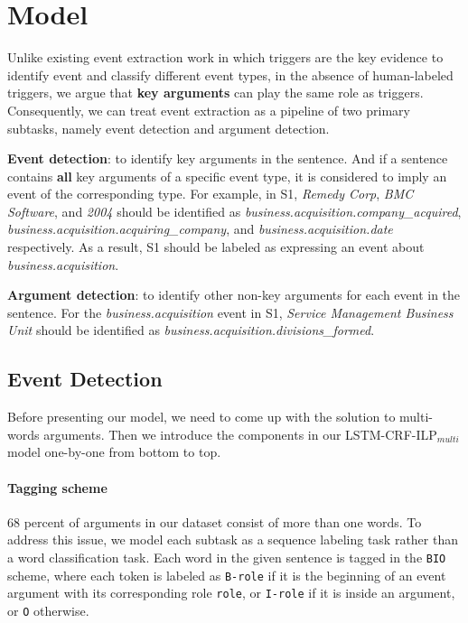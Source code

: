 \section{Model}
Unlike existing event extraction work in which triggers are the key evidence to identify event and classify different event types, in the absence of human-labeled triggers, we argue that \textbf{key arguments} can play the same role as triggers. Consequently, we can treat event extraction as a pipeline of two primary subtasks, namely event detection and argument detection.

\noindent \textbf{Event detection}: to identify key arguments in the sentence. And if a sentence contains \textbf{all} key arguments of a specific event type, it is considered to imply an event of the corresponding type. For example, in S1, \emph{Remedy Corp}, \emph{BMC Software}, and \emph{2004} should be identified as \emph{business.acquisition.company\_acquired}, \emph{business.acquisition.acquiring\_company}, and \emph{business.acquisition.date} respectively. As a result, S1 should be labeled as expressing an event about \emph{business.acquisition}.

\noindent \textbf{Argument detection}: to identify other non-key arguments for each event in the sentence. For the \emph{business.acquisition} event in S1, \emph{Service Management Business Unit} should be identified as \emph{business.acquisition.divisions\_formed}.

\subsection{Event Detection \label{evede}}
Before presenting our model, we need to come up with the solution to multi-words arguments. Then we introduce the components in our LSTM-CRF-ILP$_{multi}$ model one-by-one from bottom to top.

\paragraph{Tagging scheme}
68 percent of arguments in our dataset consist of more than one words. To address this issue, we model each subtask as a sequence labeling task rather than a word classification task. Each word in the given sentence is tagged in the \texttt{BIO} scheme, where each token is labeled as \texttt{B-role} if it is the beginning of an event argument with its corresponding role \texttt{role}, or \texttt{I-role} if it is inside an argument, or \texttt{O} otherwise. 

